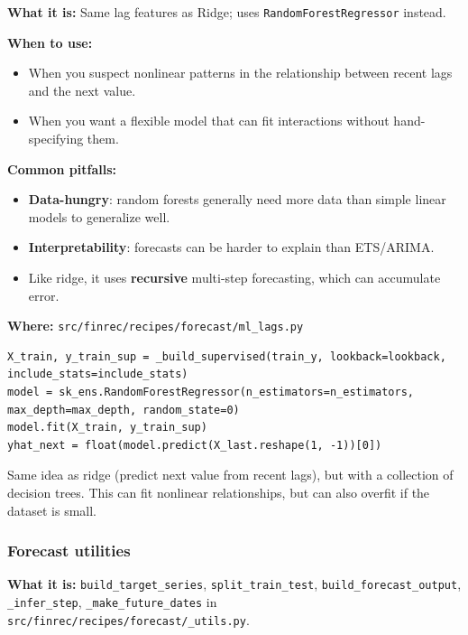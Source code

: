 \documentclass[11pt,a4paper]{article}
\begin{document}
\textbf{What it is:} Same lag features as Ridge; uses \texttt{RandomForestRegressor} instead.

\textbf{When to use:}
\begin{itemize}[leftmargin=2em]
  \item When you suspect nonlinear patterns in the relationship between recent lags and the next value.
  \item When you want a flexible model that can fit interactions without hand-specifying them.
\end{itemize}

\textbf{Common pitfalls:}
\begin{itemize}[leftmargin=2em]
  \item \textbf{Data-hungry}: random forests generally need more data than simple linear models to generalize well.
  \item \textbf{Interpretability}: forecasts can be harder to explain than ETS/ARIMA.
  \item Like ridge, it uses \textbf{recursive} multi-step forecasting, which can accumulate error.
\end{itemize}

\textbf{Where:} \texttt{src/finrec/recipes/forecast/ml\_lags.py}

\begin{lstlisting}
X_train, y_train_sup = _build_supervised(train_y, lookback=lookback, include_stats=include_stats)
model = sk_ens.RandomForestRegressor(n_estimators=n_estimators, max_depth=max_depth, random_state=0)
model.fit(X_train, y_train_sup)
yhat_next = float(model.predict(X_last.reshape(1, -1))[0])
\end{lstlisting}

\begin{intuitionbox}
Same idea as ridge (predict next value from recent lags), but with a collection of decision trees. This can fit nonlinear relationships, but can also overfit if the dataset is small.
\end{intuitionbox}

\subsubsection{Forecast utilities}\label{sec:forecast-utils}

\textbf{What it is:} \texttt{build\_target\_series}, \texttt{split\_train\_test}, \texttt{build\_forecast\_output}, \texttt{\_infer\_step}, \texttt{\_make\_future\_dates} in \texttt{src/finrec/recipes/forecast/\_utils.py}.
\end{document}
